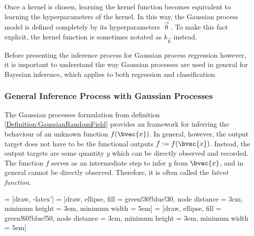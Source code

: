 			Once a kernel is chosen, learning the kernel function becomes equivalent to learning the hyperparameters of the kernel. In this way, the Gaussian process model is defined completely by its hyperparameters $\vec{\uptheta}$. To make this fact explicit, the kernel function is sometimes notated as $k_{\vec{\uptheta}}$ instead. %
			
			Before presenting the inference process for Gaussian process regression however, it is important to understand the way Gaussian processes are used in general for Bayesian inference, which applies to both regression and classification.
			
			\subsubsection{General Inference Process with Gaussian Processes}
			\label{Background:GaussianProcesses:Regression:GeneralGaussianProcessInferece}
			
				The Gaussian processes formulation from definition \ref{Definition:GaussianRandomField} provides an framework for inferring the behaviour of an unknown function $f(\bvec{x})$. In general, however, the output target does not have to be the functional outputs $f := f(\bvec{x})$. Instead, the output targets are some quantity $y$ which can be directly observed and recorded. The function $f$ serves as an intermediate step to infer $y$ from $\bvec{x}$, and in general cannot be directly observed. Therefore, it is often called the \textit{latent function}.
				
				 = [draw, -latex']
				 = [draw, ellipse, fill = green!30!blue!30, node distance = 3cm, minimum height = 3em,  minimum width = 5em]
				 = [draw, ellipse, fill = green!60!blue!50, node distance = 3cm, minimum height = 3em,  minimum width = 5em]
				
